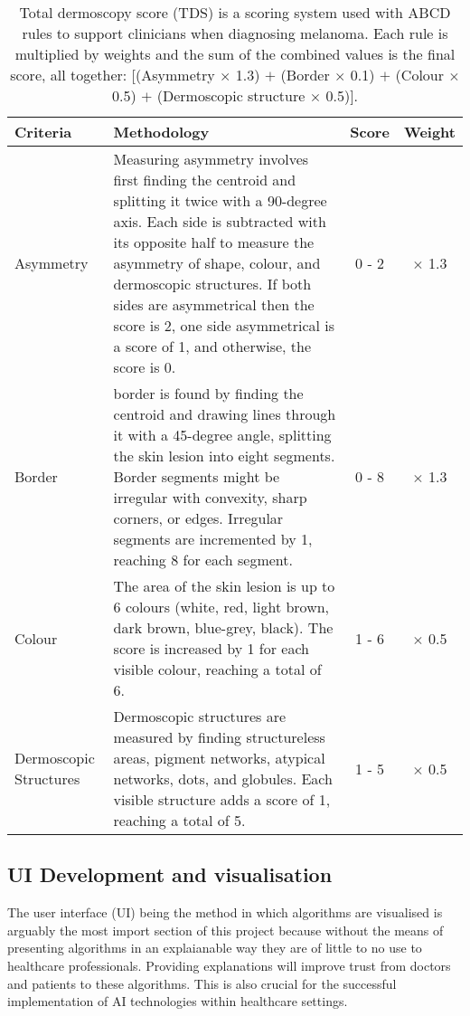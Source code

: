\begin{table}
\small
\begin{tabular}{|p{2.5cm}|p{10cm}|c|c|}
	\hline
	Criteria & Methodology & Score & Weight \\
	\hline
	Asymmetry & Measuring asymmetry involves first finding the centroid and splitting it twice with a 90-degree axis. Each side is subtracted with its opposite half to measure the asymmetry of shape, colour, and dermoscopic structures. If both sides are asymmetrical then the score is 2, one side asymmetrical is a score of 1, and otherwise, the score is 0. & 0 - 2 & $\times$ 1.3 
	\\
	\hline
	Border & border is found by finding the centroid and drawing lines through it with a 45-degree angle, splitting the skin lesion into eight segments. Border segments might be irregular with convexity, sharp corners, or edges. Irregular segments are incremented by 1, reaching 8 for each segment.  & 0 - 8 & $\times$ 1.3 
	\\
	\hline
	Colour & The area of the skin lesion is up to 6 colours (white, red, light brown, dark brown, blue-grey, black). The score is increased by 1 for each visible colour, reaching a total of 6. & 1 - 6 & $\times$ 0.5 
	\\
	\hline
	Dermoscopic Structures & Dermoscopic structures are measured by finding structureless areas, pigment networks, atypical networks, dots, and globules. Each visible structure adds a score of 1, reaching a total of 5. & 1 - 5 & $\times$ 0.5 
	\\
	\hline	
\end{tabular}
\caption{Total dermoscopy score (TDS) is a scoring system used with ABCD rules to support clinicians when diagnosing melanoma\cite{Cognetta1994}. Each rule is multiplied by weights and the sum of the combined values is the final score, all together: [(Asymmetry $\times$ 1.3) $+$ (Border $\times$ 0.1) $+$ (Colour $\times$ 0.5) $+$ (Dermoscopic structure $\times$ 0.5)].}
\end{table} \label{TDS}


\subsection{UI Development and visualisation}
The user interface (UI) being the method in which algorithms are visualised is arguably the most import section of this project because without the means of presenting algorithms in an explaianable way they are of little to no use to healthcare professionals. Providing explanations will improve trust from doctors and patients to these algorithms\cite{BarredoArrieta2020}. This is also crucial for the successful implementation of AI technologies within healthcare settings\cite{skar2017}.

